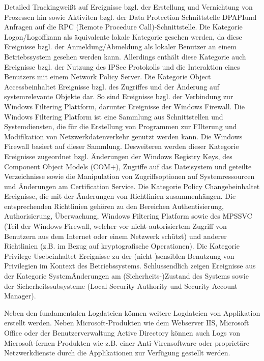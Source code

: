 \glqq Detailed Tracking\grqq weißt auf Ereignisse bzgl. der Erstellung und Vernichtung von Prozessen hin sowie Aktiviten bzgl. der Data Protection Schnittstelle \glqq DPAPI\grqq und Anfragen auf die RPC (Remote Procedure Call)-Schnittstelle.
Die Kategorie \glqq Logon/Logoff\grqq kann als äquivalente lokale Kategorie gesehen werden, da diese Ereignisse bzgl. der Anmeldung/Abmeldung als lokaler Benutzer an einem Betriebssystem gesehen werden kann. Allerdings enthält diese Kategorie auch Ereignisse bzgl. der Nutzung des IPSec Protokolls und die Interaktion eines Benutzers mit einem Network Policy Server. 
Die Kategorie \glqq Object Access\grqq beinhaltet Ereignisse bzgl. des Zugriffes und der Änderung auf systemrelevante Objekte dar. So sind Ereignisse bzgl. der Verbindung zur Windows Filtering Plattform, darunter Ereignisse der Windows Firewall. Die Windows Filtering Platform ist eine Sammlung aus Schnittstellen und Systemdiensten, die für die Erstellung von Programmen zur FIlterung und Modifikation von Netzwerkdatenverkehr genutzt werden kann. Die Windows Firewall basiert auf dieser Sammlung.
Desweiteren werden dieser Kategorie Ereignisse zugeordnet bzgl. Änderungen der Windows Registry Keys, des Component Object Models (COM+), Zugriffe auf das Dateisystem und geteilte Verzeichnisse sowie die Manipulation von Zugriffsoptionen auf Systemressourcen und Änderungen am Certification Service.
Die Kategorie \glqq Policy Change\grqq beinhaltet Ereignisse, die mit der Änderungen von Richtlinien zusammenhängen. Die entsprechenden Richtlinien gehören zu den Bereichen Authentisierung, Authorisierung, Überwachung, Windows Filtering Platform sowie des MPSSVC (Teil der Windows Firewall, welcher vor nicht-autorisiertem Zugriff von Benutzern aus dem Internet oder einem Netzwerk schützt) und anderer Richtlinien (z.B. im Bezug auf kryptografische Operationen). %
Die Kategorie \glqq Privilege Use\grqq beinhaltet Ereignisse zu der (nicht-)sensiblen Benutzung von Privilegien im Kontext des Betriebssystems. 
Schlussendlich zeigen Ereignisse aus der Kategorie \glqq System\grqq Änderungen am (Sicherheits-)Zustand des Systems sowie der Sicherheitssubsysteme (Local Security Authority und Security Account Manager).


Neben den fundamentalen Logdateien können weitere Logdateien von Applikation erstellt werden. Neben Microsoft-Produkten wie dem Webserver IIS, Microsoft Office oder der Benutzerverwaltung Active Directory können auch Logs von Microsoft-fernen Produkten wie z.B. einer Anti-Virensoftware oder proprietäre Netzwerkdienste durch die Applikationen zur Verfügung gestellt werden.

